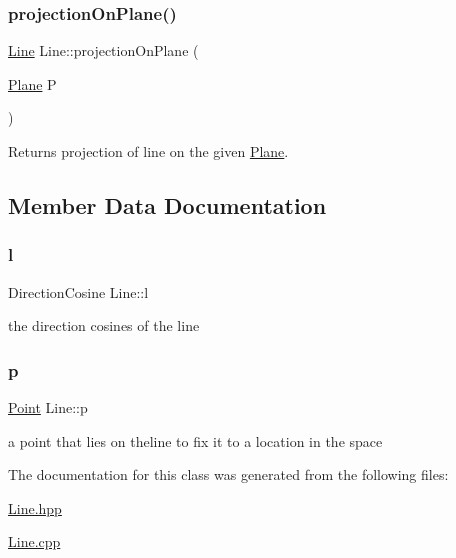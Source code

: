 \subsubsection{\texorpdfstring{projection\+On\+Plane()}{projectionOnPlane()}}
{\footnotesize\ttfamily \mbox{\hyperlink{class_line}{Line}} Line\+::projection\+On\+Plane (\begin{DoxyParamCaption}\item[{\mbox{\hyperlink{class_plane}{Plane}}}]{P }\end{DoxyParamCaption})}



Returns projection of line on the given \mbox{\hyperlink{class_plane}{Plane}}. 



\subsection{Member Data Documentation}
\mbox{\label{class_line_a03e62995fcb8f2cdd535b19f38dc7beb}} 
\subsubsection{\texorpdfstring{l}{l}}
{\footnotesize\ttfamily Direction\+Cosine Line\+::l}



the direction cosines of the line 

\mbox{\label{class_line_ade526d53a83ae2cfad4472affeb9ce8d}} 
\subsubsection{\texorpdfstring{p}{p}}
{\footnotesize\ttfamily \mbox{\hyperlink{class_point}{Point}} Line\+::p}



a point that lies on theline to fix it to a location in the space 



The documentation for this class was generated from the following files\+:\begin{DoxyCompactItemize}
\item 
\mbox{\hyperlink{_line_8hpp}{Line.\+hpp}}\item 
\mbox{\hyperlink{_line_8cpp}{Line.\+cpp}}\end{DoxyCompactItemize}
